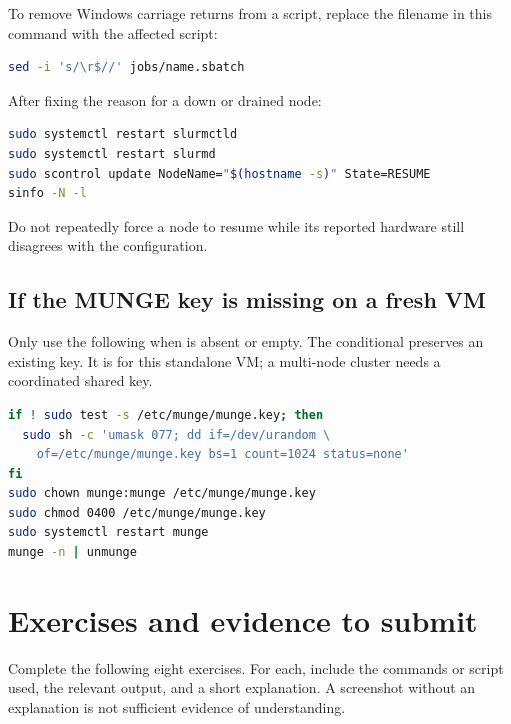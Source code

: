\documentclass[11pt,a4paper]{article}
\newcommand{\cmd}[1]{\texttt{\detokenize{#1}}}
\begin{document}
To remove Windows carriage returns from a script, replace the filename in
this command with the affected script:
\par\nobreak
\begin{minipage}{\linewidth}
\begin{lstlisting}[language=bash]
sed -i 's/\r$//' jobs/name.sbatch
\end{lstlisting}
\end{minipage}\par


After fixing the reason for a down or drained node:
\par\nobreak
\begin{minipage}{\linewidth}
\begin{lstlisting}[language=bash]
sudo systemctl restart slurmctld
sudo systemctl restart slurmd
sudo scontrol update NodeName="$(hostname -s)" State=RESUME
sinfo -N -l
\end{lstlisting}
\end{minipage}\par

Do not repeatedly force a node to resume while its reported hardware still
disagrees with the configuration.

\subsection{If the MUNGE key is missing on a fresh VM}
Only use the following when \cmd{/etc/munge/munge.key} is absent or empty.
The conditional preserves an existing key. It is for this standalone VM;
a multi-node cluster needs a coordinated shared key.
\par\nobreak
\begin{minipage}{\linewidth}
\begin{lstlisting}[language=bash]
if ! sudo test -s /etc/munge/munge.key; then
  sudo sh -c 'umask 077; dd if=/dev/urandom \
    of=/etc/munge/munge.key bs=1 count=1024 status=none'
fi
sudo chown munge:munge /etc/munge/munge.key
sudo chmod 0400 /etc/munge/munge.key
sudo systemctl restart munge
munge -n | unmunge
\end{lstlisting}
\end{minipage}\par


\section{Exercises and evidence to submit}
Complete the following eight exercises. For each, include the commands or
script used, the relevant output, and a short explanation. A screenshot
without an explanation is not sufficient evidence of understanding.
\end{document}
